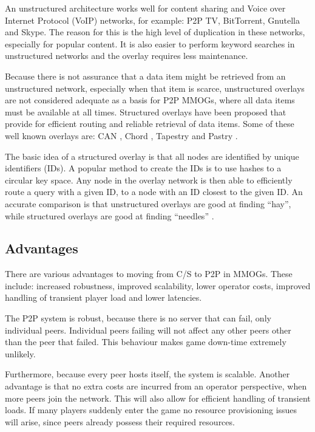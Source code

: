 \documentclass[10pt,a4paper,journal,cspaper,compsoc]{IEEEtran}
\begin{document}
An unstructured architecture works well for content sharing and Voice over Internet Protocol (VoIP) networks, for example: P2P TV, BitTorrent,
Gnutella and Skype. The reason for this is the high level of duplication in these networks, especially for popular content. It is also easier to
perform keyword searches in unstructured networks and the overlay requires less maintenance.

Because there is not assurance that a data item might be retrieved from an unstructured network, especially when that item is scarce, unstructured
overlays are not considered adequate as a basis for P2P MMOGs, where all data items must be available at all times. Structured overlays have been
proposed that provide for efficient routing and reliable retrieval of data items. Some of these well known overlays are: CAN \cite{CAN}, Chord
\cite{chord}, Tapestry \cite{tapestry} and Pastry \cite{pastry}.

The basic idea of a structured overlay is that all nodes are identified by unique identifiers (IDs). A popular method to create the IDs is to use
hashes to a circular key space. Any node in the overlay network is then able to efficiently route a query with a given ID, to a node with an ID
closest to the given ID. An accurate comparison is that unstructured overlays are good at finding ``hay'', while structured overlays are good at
finding ``needles'' \cite{Rodrigues_acm_comms_p2p}.

\subsection{Advantages}
\label{p2p_advantages}

There are various advantages to moving from C/S to P2P in MMOGs. These include: increased robustness, improved scalability, lower operator costs,
improved handling of transient player load and lower latencies.

The P2P system is robust, because there is no server that can fail, only individual peers. Individual peers failing will not affect any other peers
other than the peer that failed. This behaviour makes game down-time extremely unlikely.

Furthermore, because every peer hosts itself, the system is scalable. Another advantage is that no extra costs are incurred from an operator
perspective, when more peers join the network. This will also allow for efficient handling of transient loads. If many players suddenly enter the
game no resource provisioning issues will arise, since peers already possess their required resources.
\end{document}
